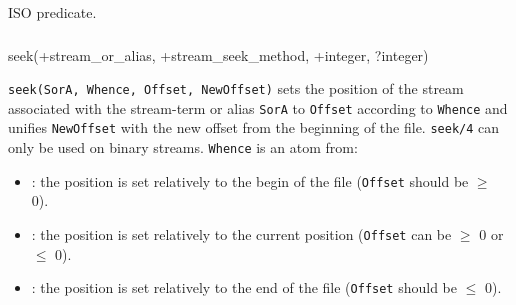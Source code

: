 \begin{PlErrors}







\end{PlErrors}

\Portability

ISO predicate.

\subsubsection{}

\begin{TemplatesOneCol}
seek(+stream\_or\_alias, +stream\_seek\_method, +integer, ?integer)

\end{TemplatesOneCol}

\Description

\texttt{seek(SorA, Whence, Offset, NewOffset)} sets the position of
the stream associated with the stream-term or alias \texttt{SorA} to
\texttt{Offset} according to \texttt{Whence} and unifies \texttt{NewOffset}
with the new offset from the beginning of the file. \texttt{seek/4} can only
be used on binary streams. \texttt{Whence} is an atom from:

\begin{itemize}

\item {}: the position is set relatively to the begin of the file
(\texttt{Offset} should be $\geq$ 0).

\item {}: the position is set relatively to the current
position (\texttt{Offset} can be $\geq$ 0 or $\leq$ 0).

\item {}: the position is set relatively to the end of the file
(\texttt{Offset} should be $\leq$ 0).

\end{itemize}

